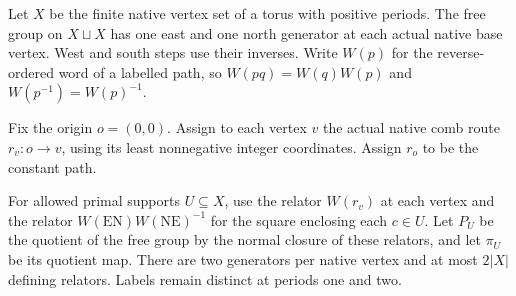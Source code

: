 \begin{definition}
    \label{def:peps_dual_path_word}
    \leanok
    Let $X$ be the finite native vertex set of a torus with positive periods.
    The free group on $X\sqcup X$ has one east and one north generator at
    each actual native base vertex. West and south steps use their inverses.
    Write $W(p)$ for the reverse-ordered word of a labelled path, so
    $W(pq)=W(q)W(p)$ and $W(p^{-1})=W(p)^{-1}$.
\end{definition}

\begin{definition}
    \label{def:peps_dual_root_routes}
    \leanok
    Fix the origin $o=(0,0)$. Assign to each vertex $v$ the actual native
    comb route $r_v:o\to v$, using its least nonnegative integer coordinates.
    Assign $r_o$ to be the constant path.
\end{definition}

\begin{definition}
    \label{def:peps_dual_finite_presentation}
    \leanok
    For allowed primal supports $U\subseteq X$, use the relator $W(r_v)$
    at each vertex and the relator $W(\mathrm{EN})W(\mathrm{NE})^{-1}$ for
    the square enclosing each $c\in U$. Let $P_U$ be the quotient of the
    free group by the normal closure of these relators, and let $\pi_U$
    be its quotient map. There are two generators per native vertex and
    at most $2|X|$ defining relators. Labels remain distinct at periods one and two.
\end{definition}

